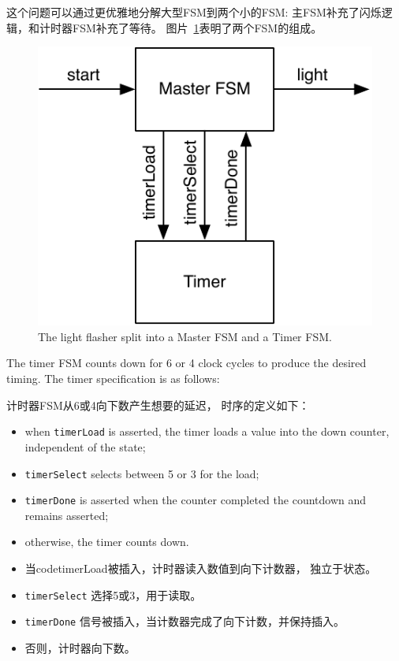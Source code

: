 \documentclass[%
    10pt,
    headinclude, footexclude,
    openright, %
    notitlepage,
    cleardoubleempty,
    headsepline,
    pointlessnumbers,
    bibtotoc, idxtotoc,
    ]{scrbook}
\newcommand{\code}[1]{{\small{\texttt{#1}}}}
\newcommand{\scale}{0.7}
\begin{document}
{这个问题可以通过更优雅地分解大型FSM到两个小的FSM: 主FSM补充了闪烁逻辑，和计时器FSM补充了等待。
图片~\ref{fig:flasher}表明了两个FSM的组成。

\begin{figure}
  \centering
  \includegraphics[scale=\scale]{figures/flasher}
  \caption{The light flasher split into a Master FSM and a Timer FSM.}
  \label{fig:flasher}
\end{figure}

The timer FSM counts down for 6 or 4 clock cycles to produce the desired timing.
The timer specification is as follows:

计时器FSM从6或4向下数产生想要的延迟，
时序的定义如下：

\begin{itemize}
\item when \code{timerLoad} is asserted, the timer loads a value into the down counter,
independent of the state;
\item \code{timerSelect} selects between 5 or 3 for the load;
\item \code{timerDone} is asserted when the counter completed the countdown
and remains asserted;
\item otherwise, the timer counts down.
\end{itemize}

\begin{itemize}
\item 当code{timerLoad}被插入，计时器读入数值到向下计数器，
独立于状态。
\item \code{timerSelect} 选择5或3，用于读取。
\item \code{timerDone} 信号被插入，当计数器完成了向下计数，并保持插入。
\item 否则，计时器向下数。
\end{itemize}

}
\end{document}
